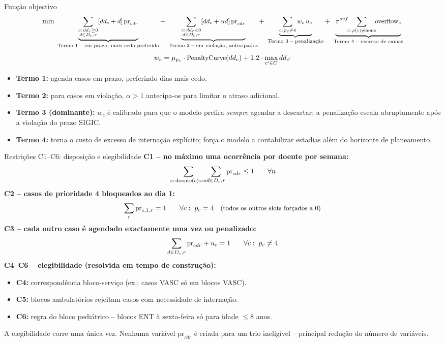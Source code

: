 \documentclass[10pt,aspectratio=169]{beamer}
\begin{document}
\begin{frame}{Fun\c{c}\~ao objectivo}
  \[\small
    \min\;
    \underbrace{\sum_{\substack{c:\,dd_c\ge0\\d\in D_c,r}}
      [dd_c+d]\,\text{pr}_{cdr}}_{\text{Termo 1 -- em prazo, mais cedo preferido}}
    +\;
    \underbrace{\sum_{\substack{c:\,dd_c<0\\d\in D_c,r}}
      [dd_c+\alpha d]\,\text{pr}_{cdr}}_{\text{Termo 2 -- em viola\c{c}\~ao, antecipados}}
    +\;
    \underbrace{\sum_{c:\,p_c\ne4} w_c\,u_c}_{\text{Termo 3 -- penaliza\c{c}\~ao}}
    +\;
    \underbrace{\pi^{ovf}\!\!\sum_{c:\,\rho(c)\ne\text{none}}\!\!\text{overflow}_c}_{\text{Termo 4 -- excesso de camas}}
  \]
  \[\small
    w_c = \mu_{p_c}\cdot\text{PenaltyCurve}(dd_c) + 1.2\cdot\max_{c'\in C}dd_{c'}
  \]
  \begin{itemize}\footnotesize
    \item \textbf{Termo 1:} agenda casos em prazo, preferindo dias mais cedo.
    \item \textbf{Termo 2:} para casos em viola\c{c}\~ao, $\alpha>1$
      antecipa-os para limitar o atraso adicional.
    \item \textbf{Termo 3 (dominante):} $w_c$ \'e calibrado para que o modelo
      prefira \emph{sempre} agendar a descartar; a penaliza\c{c}\~ao escala
      abruptamente ap\'os a viola\c{c}\~ao do prazo SIGIC.
    \item \textbf{Termo 4:} torna o custo de excesso de interna\c{c}\~ao
      expl\'icito; for\c{c}a o modelo a contabilizar estadias al\'em
      do horizonte de planeamento.
  \end{itemize}
\end{frame}

\begin{frame}{Restri\c{c}\~oes C1--C6: disposi\c{c}\~ao e elegibilidade}
  \textbf{C1 -- no m\'aximo uma ocorr\^encia por doente por semana:}
  \[\small
    \sum_{c:\,\text{doente}(c)=n}\!\sum_{d\in D_c,r}\text{pr}_{cdr}\le1
    \qquad\forall n
  \]
  \textbf{C2 -- casos de prioridade 4 bloqueados ao dia 1:}
  \[\small
    \sum_r\text{pr}_{c,1,r}=1
    \qquad\forall c:\;p_c=4
    \quad\text{(todos os outros slots for\c{c}ados a 0)}
  \]
  \textbf{C3 -- cada outro caso \'e agendado exactamente uma vez ou penalizado:}
  \[\small
    \sum_{d\in D_c,r}\text{pr}_{cdr}+u_c=1
    \qquad\forall c:\;p_c\ne4
  \]
  \textbf{C4--C6 -- elegibilidade (resolvida em tempo de constru\c{c}\~ao):}
  \begin{itemize}\footnotesize
    \item \textbf{C4:} correspond\^encia bloco-servi\c{c}o (ex.: casos VASC
      s\'o em blocos VASC).
    \item \textbf{C5:} blocos ambulat\'orios rejeitam casos com necessidade
      de interna\c{c}\~ao.
    \item \textbf{C6:} regra do bloco pedi\'atrico -- blocos ENT \`a
      sexta-feira s\'o para idade $\le8$ anos.
  \end{itemize}
  \footnotesize A elegibilidade corre uma \'unica vez. Nenhuma vari\'avel
  $\text{pr}_{cdr}$ \'e criada para um trio inelig\'ivel -- principal
  redu\c{c}\~ao do n\'umero de vari\'aveis.
\end{frame}
\end{document}
